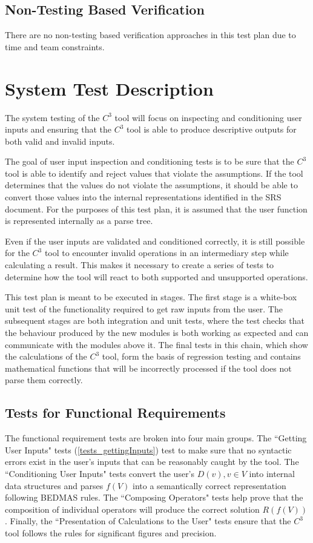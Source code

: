 \documentclass[12pt, titlepage]{article}
\newcommand{\prognameAbbrv}{$C^{3}$}
\begin{document}
\subsection{Non-Testing Based Verification}

There are no non-testing based verification approaches in this test plan due to 
time and team constraints.

\section{System Test Description}
The system testing of the \prognameAbbrv{} tool will focus on inspecting and 
conditioning user inputs and ensuring that the \prognameAbbrv{} tool is able to 
produce descriptive outputs for both valid and invalid inputs. 

The goal of user input inspection and conditioning tests is to be sure that the 
\prognameAbbrv{} tool is able to identify and reject values that violate the 
assumptions. If the tool determines that the values do not violate the 
assumptions, it should be able to convert those values into the internal 
representations identified in the SRS document. For the purposes of this test 
plan, it is assumed that the user function is represented internally as 
a parse tree.

Even if the user inputs are validated and conditioned correctly, it is still 
possible for the \prognameAbbrv{} tool to encounter invalid operations in an 
intermediary step while calculating a result. This makes it necessary to create 
a series of tests to determine how the tool will react to both supported and 
unsupported operations.

This test plan is meant to be executed in stages. The first stage is a 
white-box unit test of the functionality required to get raw inputs from the 
user. The subsequent stages are both integration and unit tests, where the test 
checks that the behaviour produced by the new modules is both working as 
expected and can communicate with the modules above it. The final tests in this 
chain, which show the calculations of the \prognameAbbrv{} tool, form the basis 
of regression testing and contains mathematical functions that will be 
incorrectly processed if the tool does not parse them correctly.
	
\subsection{Tests for Functional Requirements}
\label{testplan_functional}
The functional requirement tests are broken into four main groups. The 
``Getting User Inputs" tests (\ref{tests_gettingInputs}) test to make sure that 
no syntactic errors exist in the user's inputs that can be reasonably caught by 
the tool. The ``Conditioning User Inputs" tests convert the user's $D(v), v \in 
V$ into internal data structures and parses $f(V)$ into a semantically correct 
representation following BEDMAS rules. The ``Composing Operators" tests help 
prove that the composition of individual operators will produce the correct 
solution $R(f(V))$. Finally, the ``Presentation of Calculations to the User" 
tests ensure that the \prognameAbbrv{} tool follows the rules for significant 
figures and precision.
\end{document}
